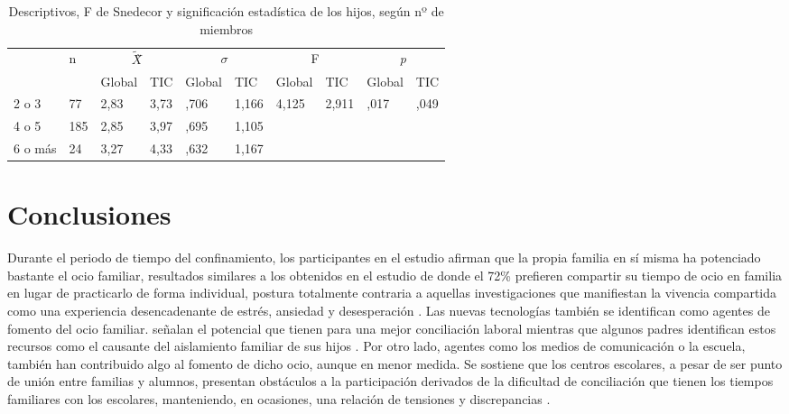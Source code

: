 \documentclass{textolivre}
\begin{document}
\begin{table}[htpb]
\caption{Descriptivos, F de Snedecor y significación estadística de los hijos, según nº de miembros}
\label{tab6}
\centering
\begin{tabular}{llllllllll}
\toprule
& \multirow{2}{*}{n} & \multicolumn{2}{c}{$\tilde{X}$̃} & \multicolumn{2}{c}{\begin{math}\sigma\end{math}} & \multicolumn{2}{c}{F} & \multicolumn{2}{c}{\emph{p}}
\\
& & Global & TIC & Global & TIC & Global & TIC & Global & TIC
\\
\midrule
2 o 3 & 77 & 2,83 & 3,73 & ,706 & 1,166 & 4,125 & 2,911 & ,017 & ,049
\\
4 o 5 & 185 & 2,85 & 3,97 & ,695 & 1,105 & & & &
\\
6 o más & 24 & 3,27 & 4,33 & ,632 & 1,167 & & & &
\\
\bottomrule
\end{tabular}
\centering
{}
\end{table}

\section{Conclusiones}
Durante el periodo de tiempo del confinamiento, los participantes en el estudio afirman que la propia familia en sí misma ha potenciado bastante el ocio familiar, resultados similares a los obtenidos en el estudio de \textcite{medina2021} donde el 72\% prefieren compartir su tiempo de ocio en familia en lugar de practicarlo de forma individual, postura totalmente contraria a aquellas investigaciones que manifiestan la vivencia compartida como una experiencia desencadenante de estrés, ansiedad y desesperación \cite{vazquezsoto2020, zayas-fajardo2021}. Las nuevas tecnologías también se identifican como agentes de fomento del ocio familiar. \textcite{vaziri2020} señalan el potencial que tienen para una mejor conciliación laboral mientras que algunos padres identifican estos recursos como el causante del aislamiento familiar de sus hijos \cite{drouin2020}. Por otro lado, agentes como los medios de comunicación o la escuela, también han contribuido algo al fomento de dicho ocio, aunque en menor medida. Se sostiene que los centros escolares, a pesar de ser punto de unión entre familias y alumnos, presentan obstáculos a la participación derivados de la dificultad de conciliación que tienen los tiempos familiares con los escolares, manteniendo, en ocasiones, una relación de tensiones y discrepancias \cite{moreno2020}.
\end{document}
